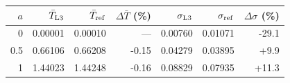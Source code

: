 \begin{tabular}{rrrrrrr}\toprule
$a$ & $\bar T_{\rm L3}$ & $\bar T_{\rm ref}$ & $\Delta\bar T$ (\%) & $\sigma_{\rm L3}$ & $\sigma_{\rm ref}$ & $\Delta\sigma$ (\%)\\\midrule
0 & 0.00001 & 0.00010 & --- & 0.00760 & 0.01071 & -29.1 \\
0.5 & 0.66106 & 0.66208 & -0.15 & 0.04279 & 0.03895 & +9.9 \\
1 & 1.44023 & 1.44248 & -0.16 & 0.08829 & 0.07935 & +11.3 \\
\bottomrule\end{tabular}
